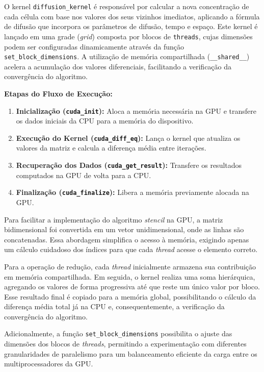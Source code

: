 \documentclass[12pt]{article}
\begin{document}
O kernel \texttt{diffusion\_kernel} é responsável por calcular a nova
concentração de cada célula com base nos valores dos seus vizinhos imediatos,
aplicando a fórmula de difusão que incorpora os parâmetros de difusão, tempo e
espaço. Este kernel é lançado em uma grade (\textit{grid}) composta por blocos
de \texttt{threads}, cujas dimensões podem ser configuradas dinamicamente
através da função \texttt{set\_block\_dimensions}. A utilização de memória
compartilhada (\texttt{\_\_shared\_\_}) acelera a acumulação dos valores
diferenciais, facilitando a verificação da convergência do algoritmo.

\textbf{Etapas do Fluxo de Execução:}
\begin{enumerate}
  \item \textbf{Inicialização (\texttt{cuda\_init}):}
        Aloca a memória necessária na GPU e transfere os dados iniciais da CPU para a memória do dispositivo.
  \item \textbf{Execução do Kernel (\texttt{cuda\_diff\_eq}):}
        Lança o kernel que atualiza os valores da matriz e calcula a diferença média entre iterações.
  \item \textbf{Recuperação dos Dados (\texttt{cuda\_get\_result}):}
        Transfere os resultados computados na GPU de volta para a CPU.
  \item \textbf{Finalização (\texttt{cuda\_finalize}):}
        Libera a memória previamente alocada na GPU.
\end{enumerate}

Para facilitar a implementação do algoritmo \textit{stencil} na GPU, a matriz
bidimensional foi convertida em um vetor unidimensional, onde as linhas são
concatenadas. Essa abordagem simplifica o acesso à memória, exigindo apenas um
cálculo cuidadoso dos índices para que cada \textit{thread} acesse o elemento
correto.

Para a operação de redução, cada \textit{thread} inicialmente armazena sua
contribuição em memória compartilhada. Em seguida, o kernel realiza uma soma
hierárquica, agregando os valores de forma progressiva até que reste um único
valor por bloco. Esse resultado final é copiado para a memória global,
possibilitando o cálculo da diferença média total já na CPU e,
consequentemente, a verificação da convergência do algoritmo.

Adicionalmente, a função \texttt{set\_block\_dimensions} possibilita o ajuste
das dimensões dos blocos de \textit{threads}, permitindo a experimentação com
diferentes granularidades de paralelismo para um balanceamento eficiente da
carga entre os multiprocessadores da GPU.
\end{document}
